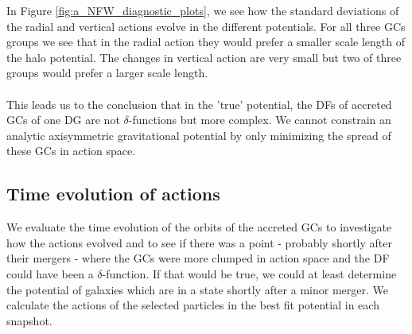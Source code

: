 In Figure \ref{fig:a_NFW_diagnostic_plots}, we see how the standard deviations of the radial and vertical actions evolve in the different potentials. For all three \acp{GC} groups we see that in the radial action they would prefer a smaller scale length of the halo potential. The changes in vertical action are very small but two of three groups would prefer a larger scale length. 
\\\\This leads us to the conclusion that in the 'true' potential, the \acp{DF} of accreted \acp{GC} of one \ac{DG} are not $\delta$-functions but more complex. We cannot constrain an analytic axisymmetric gravitational potential by only minimizing the spread of these \acp{GC} in action space.

\subsection{Time evolution of actions}\label{subsec:time_evo_actions}
We evaluate the time evolution of the orbits of the accreted \acp{GC} to investigate how the actions evolved and to see if there was a point - probably shortly after their mergers - where the \acp{GC} were more clumped in action space and the \ac{DF} could have been a $\delta$-function. If that would be true, we could at least determine the potential of galaxies which are in a state shortly after a minor merger. We calculate the actions of the selected particles in the best fit potential in each snapshot.  

